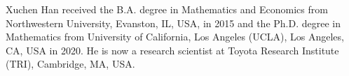 \begin{IEEEbiography}
{Xuchen Han} received the B.A. degree in Mathematics and Economics from
Northwestern University, Evanston, IL, USA, in 2015 and the Ph.D. degree in
Mathematics from University of California, Los Angeles (UCLA), Los Angeles, CA,
USA in 2020. He is now a research scientist at Toyota Research Institute (TRI),
Cambridge, MA, USA.
\end{IEEEbiography}
